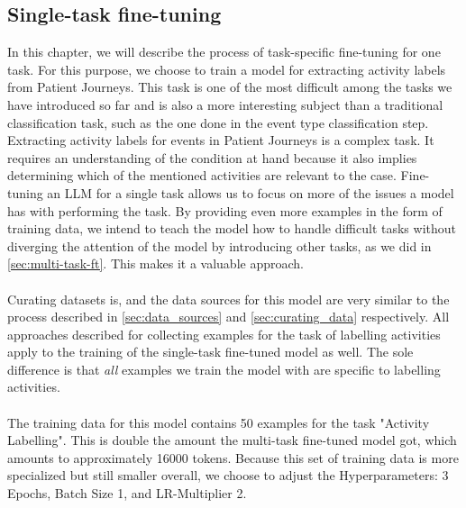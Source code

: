 \subsection{Single-task fine-tuning}\label{sec:single-task-ft}
In this chapter, we will describe the process of task-specific fine-tuning for one task. For this purpose, we choose to train a model for extracting activity labels from Patient Journeys. This task is one of the most difficult among the tasks we have introduced so far and is also a more interesting subject than a traditional classification task, such as the one done in the event type classification step.\\
Extracting activity labels for events in Patient Journeys is a complex task. It requires an understanding of the condition at hand because it also implies determining which of the mentioned activities are relevant to the case. Fine-tuning an LLM for a single task allows us to focus on more of the issues a model has with performing the task. By providing even more examples in the form of training data, we intend to teach the model how to handle difficult tasks without diverging the attention of the model by introducing other tasks, as we did in \autoref{sec:multi-task-ft}. This makes it a valuable approach.\\\\
Curating datasets is, and the data sources for this model are very similar to the process described in \autoref{sec:data_sources} and \autoref{sec:curating_data} respectively. All approaches described for collecting examples for the task of labelling activities apply to the training of the single-task fine-tuned model as well. The sole difference is that \emph{all} examples we train the model with are specific to labelling activities.\\\\
The training data for this model contains 50 examples for the task "Activity Labelling". This is double the amount the multi-task fine-tuned model got, which amounts to approximately 16000 tokens. Because this set of training data is more specialized but still smaller overall, we choose to adjust the Hyperparameters: 3 Epochs, Batch Size 1, and LR-Multiplier 2.

